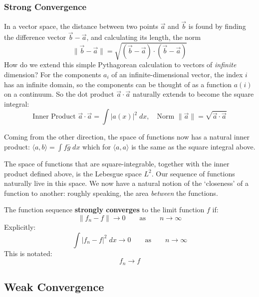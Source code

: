 \documentclass[12pt, a4paper, twoside, openright]{book}
\begin{document}
\subsubsection*{Strong Convergence}

In a vector space, the distance between two points $\vec{a}$ and $\vec{b}$ is found by finding the difference vector $\vec{b} - \vec{a}$, and calculating its length, the norm 
\begin{equation}
\lVert  \vec{b} - \vec{a} \rVert = \sqrt{(\vec{b} - \vec{a})\cdot (\vec{b} - \vec{a})}
\end{equation}
How do we extend this simple Pythagorean calculation to vectors of \emph{infinite} dimension? For the components $a_i$ of an infinite-dimensional vector, the index $i$ has an infinite domain, so the components can be thought of as a function $a(i)$ on a continuum. So the dot product $\vec{a} \cdot \vec{a}$ naturally extends to become the square integral:
\begin{equation}
\text{Inner Product } \vec{a} \cdot \vec{a} = \int \lvert a(x) \rvert^2 \;dx,
\quad \text{Norm } \lVert \vec{a} \rVert = \sqrt{\vec{a} \cdot \vec{a} }
\end{equation}

Coming from the other direction, the space of functions now has a natural inner product: $ \langle a,b \rangle = \int f \bar{g}\; dx $ which for $\langle a,a \rangle$ is the same as the square integral above.

The space of functions that are square-integrable, together with the inner product defined above, is the Lebesgue space $L^2$.  Our sequence of functions naturally live in this space.  We now have a natural notion of the `closeness' of a function to another: roughly speaking, the area \emph{between} the functions.

The function sequence \textbf{strongly converges} to the limit function $f$ if:
\begin{equation}
\lVert f_n - f \rVert \to 0 \qquad \text{as} \qquad n \to \infty
\end{equation}
Explicitly:
\begin{equation}
\int \lvert f_n - f \rvert^2 \;dx  \to 0 \qquad \text{as} \qquad n \to \infty
\end{equation}
This is notated:
\begin{equation}
f_n \to f
\end{equation}



\subsection*{Weak Convergence}
\end{document}
